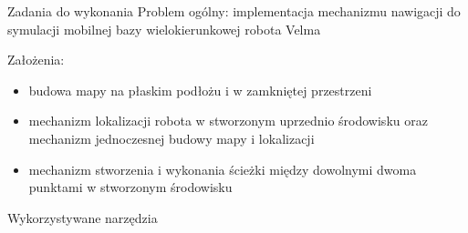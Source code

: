 \begin{frame}
{Zadania do wykonania}
Problem ogólny: implementacja mechanizmu nawigacji do symulacji mobilnej bazy wielokierunkowej robota Velma

Założenia:
	\begin{itemize}
		\item budowa mapy na płaskim podłożu i w zamkniętej przestrzeni
		\item mechanizm lokalizacji robota w stworzonym uprzednio środowisku oraz mechanizm jednoczesnej budowy mapy i lokalizacji
		\item mechanizm stworzenia i wykonania ścieżki między dowolnymi dwoma punktami w stworzonym środowisku
	\end{itemize}
\end{frame}

\begin{frame}
{Wykorzystywane narzędzia}
\end{frame}


